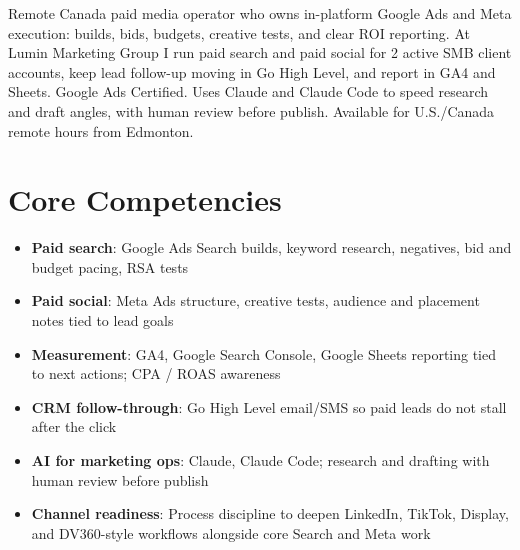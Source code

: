\documentclass[11pt,a4paper,sans]{moderncv}
\begin{document}
\makecvtitle

\vspace{6pt}
\small{Remote Canada paid media operator who owns in-platform Google Ads and Meta execution: builds, bids, budgets, creative tests, and clear ROI reporting. At Lumin Marketing Group I run paid search and paid social for 2 active SMB client accounts, keep lead follow-up moving in Go High Level, and report in GA4 and Sheets. Google Ads Certified. Uses Claude and Claude Code to speed research and draft angles, with human review before publish. Available for U.S./Canada remote hours from Edmonton.}

\section{Core Competencies}
\vspace{1pt}
\begin{itemize}
\item \textbf{Paid search}: Google Ads Search builds, keyword research, negatives, bid and budget pacing, RSA tests
\item \textbf{Paid social}: Meta Ads structure, creative tests, audience and placement notes tied to lead goals
\item \textbf{Measurement}: GA4, Google Search Console, Google Sheets reporting tied to next actions; CPA / ROAS awareness
\item \textbf{CRM follow-through}: Go High Level email/SMS so paid leads do not stall after the click
\item \textbf{AI for marketing ops}: Claude, Claude Code; research and drafting with human review before publish
\item \textbf{Channel readiness}: Process discipline to deepen LinkedIn, TikTok, Display, and DV360-style workflows alongside core Search and Meta work
\end{itemize}
\end{document}
